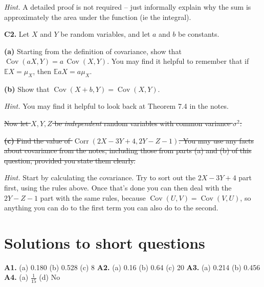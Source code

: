 \documentclass[
  a4paper,
]{book}
\theoremstyle{definition}
\theoremstyle{definition}
\theoremstyle{definition}
\theoremstyle{definition}
\theoremstyle{remark}
\begin{document}
\begin{myanswers}
\emph{Hint.} A detailed proof is not required -- just informally explain why the sum is approximately the area under the function (ie the integral).

\end{myanswers}

\textbf{C2.} Let \(X\) and \(Y\) be random variables, and let \(a\) and \(b\) be constants.

\textbf{(a)} Starting from the definition of covariance, show that \(\operatorname{Cov}(aX, Y) = a\,\operatorname{Cov}(X,Y)\). You may find it helpful to remember that if \(\mathbb EX = \mu_X\), then \(\mathbb EaX = a\mu_X\).

\textbf{(b)} Show that \(\operatorname{Cov}(X + b, Y) = \operatorname{Cov}(X, Y)\).

\begin{myanswers}
\emph{Hint.} You may find it helpful to look back at Theorem 7.4 in the notes.

\end{myanswers}

\sout{Now let \(X, Y, Z\) be \emph{independent} random variables with common variance \(\sigma^2\).}

\sout{\textbf{(c)} Find the value of \(\operatorname{Corr}(2X - 3Y + 4, 2Y - Z - 1)\). You may use any facts about covariance from the notes, including those from parts (a) and (b) of this question, provided you state them clearly.}

\begin{myanswers}
\emph{Hint.} Start by calculating the covariance. Try to sort out the \(2X - 3Y + 4\) part first, using the rules above. Once that's done you can then deal with the \(2Y - Z -1\) part with the same rules, because \(\operatorname{Cov}(U, V) = \operatorname{Cov}(V,U)\), so anything you can do to the first term you can also do to the second.

\end{myanswers}

\hypertarget{P4-short-sols}{%
\section*{Solutions to short questions}\label{P4-short-sols}}

\textbf{A1.} (a) 0.180 (b) 0.528 (c) 8 \textbf{A2.} (a) 0.16 (b) 0.64 (c) 20 \textbf{A3.} (a) 0.214 (b) 0.456 \textbf{A4.} (a) \(\frac{1}{15}\) (d) No
\end{document}
